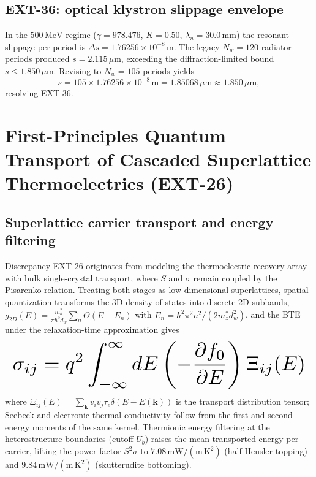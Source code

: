 \subsection*{EXT-36: optical klystron slippage envelope}
In the $500\,\mathrm{MeV}$ regime ($\gamma = 978.476$, $K = 0.50$,
$\lambda_u = 30.0\,\mathrm{mm}$) the resonant slippage per period is
$\Delta s = 1.76256\times10^{-8}\,\mathrm{m}$. The legacy $N_w = 120$
radiator periods produced $s = 2.115\,\mu\mathrm{m}$, exceeding the
diffraction-limited bound $s \le 1.850\,\mu\mathrm{m}$. Revising to
$N_w = 105$ periods yields
\begin{equation}
s = 105 \times 1.76256\times10^{-8}\,\mathrm{m}
= 1.85068\,\mu\mathrm{m} \approx 1.850\,\mu\mathrm{m},
\end{equation}
resolving EXT-36.

\section{First-Principles Quantum Transport of Cascaded Superlattice
Thermoelectrics (EXT-26)}
\label{app:teg_bte}

\subsection*{Superlattice carrier transport and energy filtering}
Discrepancy EXT-26 originates from modeling the thermoelectric recovery
array with bulk single-crystal transport, where $S$ and $\sigma$ remain
coupled by the Pisarenko relation. Treating both stages as
low-dimensional superlattices, spatial quantization transforms the 3D
density of states into discrete 2D subbands,
$g_{2D}(E) = \frac{m_d^*}{\pi\hbar^2 d_w}\sum_n \Theta(E - E_n)$ with
$E_n = \hbar^2\pi^2 n^2/(2m_z^* d_w^2)$, and the BTE under the
relaxation-time approximation gives
\[
\resizebox{0.99\columnwidth}{!}{$\displaystyle
\sigma_{ij} = q^2 \int_{-\infty}^{\infty} dE
\left(-\frac{\partial f_0}{\partial E}\right) \Xi_{ij}(E)$}
\]
where $\Xi_{ij}(E) = \sum_{\mathbf{k}} v_i v_j \tau_e \delta(E -
E(\mathbf{k}))$ is the transport distribution tensor; Seebeck and
electronic thermal conductivity follow from the first and second
energy moments of the same kernel. Thermionic energy filtering at the
heterostructure boundaries (cutoff $U_b$) raises the mean transported
energy per carrier, lifting the power factor $S^2\sigma$ to $7.08\,
\mathrm{mW/(m\,K^2)}$ (half-Heusler topping) and $9.84\,
\mathrm{mW/(m\,K^2)}$ (skutterudite bottoming).

